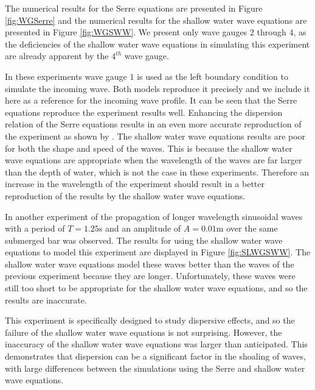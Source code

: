 \documentclass[a4paper,fleqn]{article} %
\begin{document}
The numerical results for the Serre equations are presented in Figure \ref{fig:WGSerre} and the numerical results for the shallow water wave equations are presented in Figure \ref{fig:WGSWW}. We present only wave gauges $2$ through $4$, as the deficiencies of the shallow water wave equations in simulating this experiment are already apparent by the $4^{th}$ wave gauge.

In these experiments wave gauge $1$ is used as the left boundary condition to simulate the incoming wave. Both models reproduce it precisely and we include it here as a reference for the incoming wave profile. It can be seen that the Serre equations reproduce the experiment results well. Enhancing the dispersion relation of the Serre equations results in an even more accurate reproduction of the experiment as shown by \cite{Lannes-2013}. The shallow water wave equations results are poor for both the shape and speed of the waves. This is because the shallow water wave equations are appropriate when the wavelength of the waves are far larger than the depth of water, which is not the case in these experiments. Therefore an increase in the wavelength of the experiment should result in a better reproduction of the results by the shallow water wave equations. 

In another experiment of \cite{Beji-Battjes-1994} the propagation of longer wavelength sinusoidal waves with a period of $T = 1.25$s and an amplitude of $A = 0.01$m over the same submerged bar was observed. The results for using the shallow water wave equations to model this experiment are displayed in Figure \ref{fig:SLWGSWW}. The shallow water wave equations model these waves better than the waves of the previous experiment because they are longer. Unfortunately, these waves were still too short to be appropriate for the shallow water wave equations, and so the results are inaccurate.

This experiment is specifically designed to study dispersive effects, and so the failure of the shallow water wave equations is not surprising. However, the inaccuracy of the shallow water wave equations was larger than anticipated. This demonstrates that dispersion can be a significant factor in the shoaling of waves, with large differences between the simulations using the Serre and shallow water wave equations.
\end{document}
